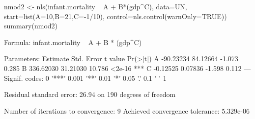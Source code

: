 \begin{Schunk}
\begin{Sinput}
 nmod2 <- nls(infant.mortality ~ A + B*(gdp^C), data=UN, start=list(A=10,B=21,C=-1/10), control=nls.control(warnOnly=TRUE))
 summary(nmod2)
\end{Sinput}
\begin{Soutput}
Formula: infant.mortality ~ A + B * (gdp^C)

Parameters:
   Estimate Std. Error t value Pr(>|t|)    
A -90.23234   84.12664  -1.073    0.285    
B 336.62030   31.21030  10.786   <2e-16 ***
C  -0.12525    0.07836  -1.598    0.112    
---
Signif. codes:  0 '***' 0.001 '**' 0.01 '*' 0.05 '.' 0.1 ' ' 1

Residual standard error: 26.94 on 190 degrees of freedom

Number of iterations to convergence: 9 
Achieved convergence tolerance: 5.329e-06
\end{Soutput}
\end{Schunk}
